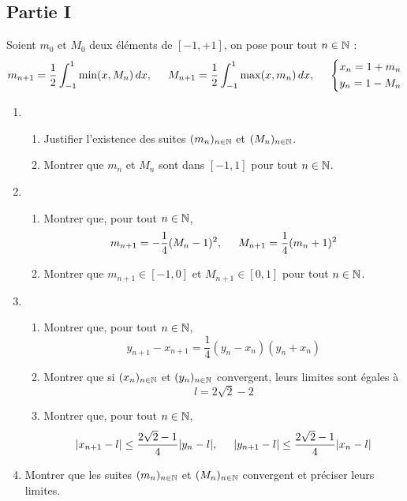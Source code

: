 \subsection*{Partie I}
Soient $m_0$ et $M_0$ deux éléments de $[-1,+1]$, on pose pour tout $n\in \mathbb{N}$ :
\begin{displaymath}
 m_{n+1} = \frac{1}{2}\int_{-1}^{1}\min (x,M_n)\,dx, \hspace{0.5cm}
 M_{n+1} = \frac{1}{2}\int_{-1}^{1}\max (x,m_n)\,dx ,\hspace{0.5cm}
\left\lbrace
\begin{aligned}
 x_n = 1+m_n \\ y_n = 1 -M_n 
\end{aligned}
\right.  
\end{displaymath}
\begin{enumerate}
 \item 
  \begin{enumerate}
   \item Justifier l'existence des suites $(m_n)_{n\in\mathbb{N}}$ et $(M_n)_{n\in\mathbb{N}}$.
   \item Montrer que $m_n$ et $M_n$ sont dans $[-1,1]$ pour tout $n\in \mathbb{N}$.
  \end{enumerate}

 \item 
  \begin{enumerate}
   \item Montrer que, pour tout $n\in \mathbb{N}$,
\begin{displaymath}
 m_{n+1}=-\frac{1}{4}(M_n-1)^2 ,\hspace{0.5cm} M_{n+1}=\frac{1}{4}(m_n+1)^2
\end{displaymath}
   \item Montrer que $m_{n+1}\in[-1,0]$ et $M_{n+1}\in [0,1]$ pour tout $n\in \mathbb{N}$.
  \end{enumerate}

 \item 
  \begin{enumerate}
   \item Montrer que, pour tout $n\in \mathbb{N}$,
\begin{displaymath}
 y_{n+1}-x_{n+1} = \frac{1}{4}(y_n-x_n)(y_n+x_n)
\end{displaymath}
   \item Montrer que si $(x_n)_{n\in\mathbb{N}}$ et $(y_n)_{n\in\mathbb{N}}$ convergent, leurs limites sont égales à
\begin{displaymath}
 l=2\sqrt{2}-2
\end{displaymath}
   \item Montrer que, pour tout $n\in \mathbb{N}$, 
\begin{displaymath}
 |x_{n+1}-l|\leq \frac{2\sqrt{2}-1}{4}|y_{n}-l|, \hspace{0.5cm} 
|y_{n+1}-l|\leq \frac{2\sqrt{2}-1}{4}|x_{n}-l|
\end{displaymath}
  \end{enumerate}

\item Montrer que les suites $(m_n)_{n\in\mathbb{N}}$ et $(M_n)_{n\in\mathbb{N}}$ convergent et préciser leurs limites.
\end{enumerate}

